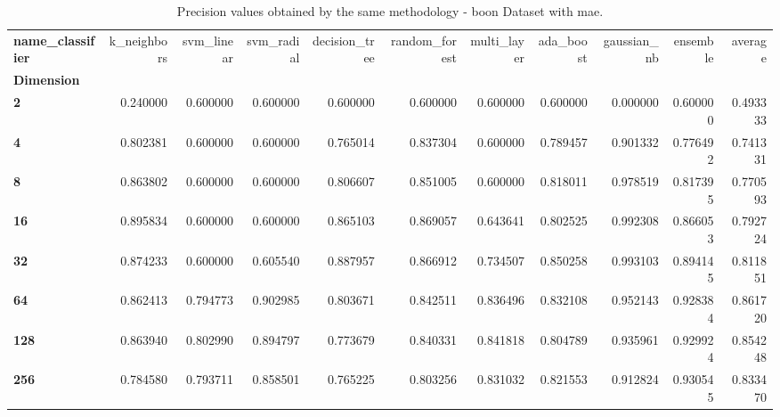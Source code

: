 \begin{table}
\centering
\caption{Precision values obtained by the same methodology - boon Dataset with mae.}
\label{precision_boon_mae-reproduction}
\begin{tabular}{lrrrrrrrrrr}
\toprule
\textbf{name\_classifier} &  k\_neighbors &  svm\_linear &  svm\_radial &  decision\_tree &  random\_forest &  multi\_layer &  ada\_boost &  gaussian\_nb &  ensemble &   average \\
\textbf{Dimension} &              &             &             &                &                &              &            &              &           &           \\
\midrule
\textbf{2        } &     0.240000 &    0.600000 &    0.600000 &       0.600000 &       0.600000 &     0.600000 &   0.600000 &     0.000000 &  0.600000 &  0.493333 \\
\textbf{4        } &     0.802381 &    0.600000 &    0.600000 &       0.765014 &       0.837304 &     0.600000 &   0.789457 &     0.901332 &  0.776492 &  0.741331 \\
\textbf{8        } &     0.863802 &    0.600000 &    0.600000 &       0.806607 &       0.851005 &     0.600000 &   0.818011 &     0.978519 &  0.817395 &  0.770593 \\
\textbf{16       } &     0.895834 &    0.600000 &    0.600000 &       0.865103 &       0.869057 &     0.643641 &   0.802525 &     0.992308 &  0.866053 &  0.792724 \\
\textbf{32       } &     0.874233 &    0.600000 &    0.605540 &       0.887957 &       0.866912 &     0.734507 &   0.850258 &     0.993103 &  0.894145 &  0.811851 \\
\textbf{64       } &     0.862413 &    0.794773 &    0.902985 &       0.803671 &       0.842511 &     0.836496 &   0.832108 &     0.952143 &  0.928384 &  0.861720 \\
\textbf{128      } &     0.863940 &    0.802990 &    0.894797 &       0.773679 &       0.840331 &     0.841818 &   0.804789 &     0.935961 &  0.929924 &  0.854248 \\
\textbf{256      } &     0.784580 &    0.793711 &    0.858501 &       0.765225 &       0.803256 &     0.831032 &   0.821553 &     0.912824 &  0.930545 &  0.833470 \\
\bottomrule
\end{tabular}
\end{table}
